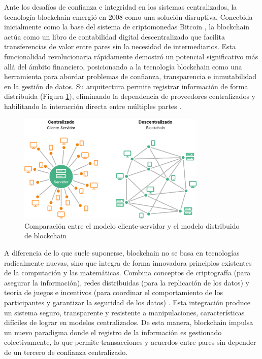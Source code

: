 Ante los desafíos de confianza e integridad en los sistemas centralizados, la tecnología blockchain emergió en 2008 como una solución disruptiva. Concebida inicialmente como la base del sistema de criptomonedas Bitcoin \cite{satoshi2008bitcoin}, la blockchain actúa como un libro de contabilidad digital descentralizado que facilita transferencias de valor entre pares sin la necesidad de intermediarios. Esta funcionalidad revolucionaria rápidamente demostró un potencial significativo más allá del ámbito financiero, posicionando a la tecnología blockchain como una herramienta para abordar problemas de confianza, transparencia e inmutabilidad en la gestión de datos. Su arquitectura permite registrar información de forma distribuida (Figura \ref{fig:web-architecture}), eliminando la dependencia de proveedores centralizados y habilitando la interacción directa entre múltiples partes \cite{bulkowska2023implementation}.

\begin{figure}[!tb] 
    \centering
    \includegraphics[width=0.8\textwidth]{Figures/client-server-vs-p2p.png}
    \caption{Comparación entre el modelo cliente-servidor y el modelo distribuido de blockchain}
    \label{fig:web-architecture}
\end{figure}

A diferencia de lo que suele suponerse, blockchain no se basa en tecnologías radicalmente nuevas, sino que integra de forma innovadora principios existentes de la computación y las matemáticas. Combina conceptos de criptografía (para asegurar la información), redes distribuidas (para la replicación de los datos) y teoría de juegos e incentivos (para coordinar el comportamiento de los participantes y garantizar la seguridad de los datos) \cite{sunny2022systematic, bulkowska2023implementation}. Esta integración produce un sistema seguro, transparente y resistente a manipulaciones, características difíciles de lograr en modelos centralizados. De esta manera, blockchain impulsa un nuevo paradigma donde el registro de la información es gestionado colectivamente, lo que permite transacciones y acuerdos entre pares sin depender de un tercero de confianza centralizado.

